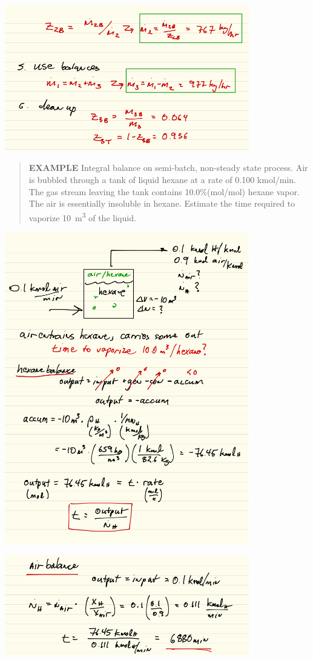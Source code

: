 \documentclass[11pt]{article}
\begin{document}
\includegraphics[width=0.8\textwidth]{./figs/Diff-balance6.png}

\begin{quote}
\textbf{EXAMPLE} Integral balance on semi-batch, non-steady state process.  Air is bubbled through a tank of liquid hexane at a rate of 0.100 kmol/min.  The gas stream leaving the tank contains 10.0\%(mol/mol) hexane vapor.
The air is essentially insoluble in hexane.  Estimate the time required to vaporize \SI{10}{\meter\cubed} of the liquid.
\end{quote}

\includegraphics[width=0.8\textwidth]{./figs/Int-balance1.png}

\includegraphics[width=0.8\textwidth]{./figs/Int-balance2.png}
\end{document}

